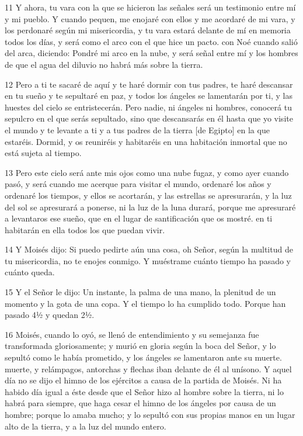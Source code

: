 \par 11 Y ahora, tu vara con la que se hicieron las señales será un testimonio entre mí y mi pueblo. Y cuando pequen, me enojaré con ellos y me acordaré de mi vara, y los perdonaré según mi misericordia, y tu vara estará delante de mí en memoria todos los días, y será como el arco con el que hice un pacto. con Noé cuando salió del arca, diciendo: Pondré mi arco en la nube, y será señal entre mí y los hombres de que el agua del diluvio no habrá más sobre la tierra.

\par 12 Pero a ti te sacaré de aquí y te haré dormir con tus padres, te haré descansar en tu sueño y te sepultaré en paz, y todos los ángeles se lamentarán por ti, y las huestes del cielo se entristecerán. Pero nadie, ni ángeles ni hombres, conocerá tu sepulcro en el que serás sepultado, sino que descansarás en él hasta que yo visite el mundo y te levante a ti y a tus padres de la tierra [de Egipto] en la que estaréis. Dormid, y os reuniréis y habitaréis en una habitación inmortal que no está sujeta al tiempo.

\par 13 Pero este cielo será ante mis ojos como una nube fugaz, y como ayer cuando pasó, y será cuando me acerque para visitar el mundo, ordenaré los años y ordenaré los tiempos, y ellos se acortarán, y las estrellas se apresurarán, y la luz del sol se apresurará a ponerse, ni la luz de la luna durará, porque me apresuraré a levantaros ese sueño, que en el lugar de santificación que os mostré. en ti habitarán en ella todos los que puedan vivir.

\par 14 Y Moisés dijo: Si puedo pedirte aún una cosa, oh Señor, según la multitud de tu misericordia, no te enojes conmigo. Y muéstrame cuánto tiempo ha pasado y cuánto queda.

\par 15 Y el Señor le dijo: Un instante, la palma de una mano, la plenitud de un momento y la gota de una copa. Y el tiempo lo ha cumplido todo. Porque han pasado 4½ y quedan 2½.

\par 16 Moisés, cuando lo oyó, se llenó de entendimiento y su semejanza fue transformada gloriosamente; y murió en gloria según la boca del Señor, y lo sepultó como le había prometido, y los ángeles se lamentaron ante su muerte. muerte, y relámpagos, antorchas y flechas iban delante de él al unísono. Y aquel día no se dijo el himno de los ejércitos a causa de la partida de Moisés. Ni ha habido día igual a éste desde que el Señor hizo al hombre sobre la tierra, ni lo habrá para siempre, que haga cesar el himno de los ángeles por causa de un hombre; porque lo amaba mucho; y lo sepultó con sus propias manos en un lugar alto de la tierra, y a la luz del mundo entero.

